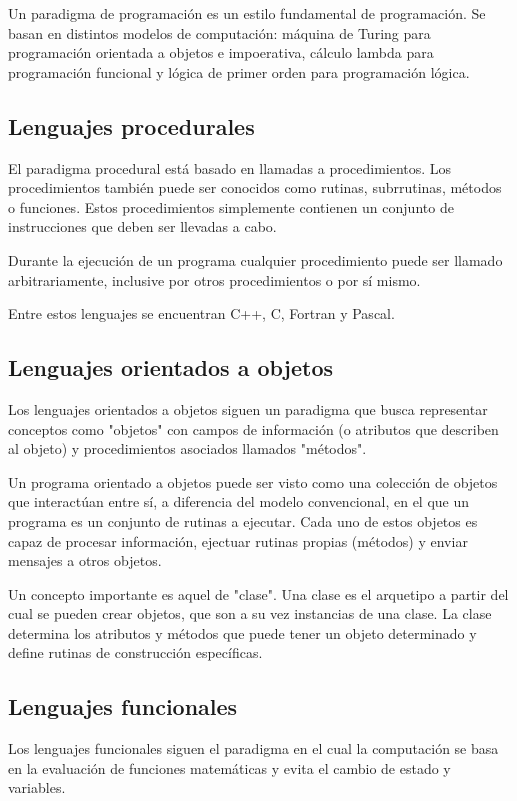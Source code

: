 \documentclass[a4paper,10pt]{article}
\begin{document}
Un paradigma de programación es un estilo fundamental de programación. Se basan en distintos modelos de computación: máquina de Turing para programación orientada a objetos e impoerativa, cálculo lambda para programación funcional y lógica de primer orden para programación lógica.

\subsection{Lenguajes procedurales}

El paradigma procedural está basado en llamadas a procedimientos. Los procedimientos también puede ser conocidos como rutinas, subrrutinas, métodos o funciones. Estos procedimientos simplemente contienen un conjunto de instrucciones que deben ser llevadas a cabo.

Durante la ejecución de un programa cualquier procedimiento puede ser llamado arbitrariamente, inclusive por otros procedimientos o por sí mismo.

Entre estos lenguajes se encuentran C++, C, Fortran y Pascal.


\subsection{Lenguajes orientados a objetos}

Los lenguajes orientados a objetos siguen un paradigma que busca representar conceptos como "objetos" con campos de información (o atributos que describen al objeto) y procedimientos asociados llamados "métodos".

Un programa orientado a objetos puede ser visto como una colección de objetos que interactúan entre sí, a diferencia del modelo convencional, en el que un programa es un conjunto de rutinas a ejecutar. Cada uno de estos objetos es capaz de procesar información, ejectuar rutinas propias (métodos) y enviar mensajes a otros objetos.

Un concepto importante es aquel de "clase". Una clase es el arquetipo a partir del cual se pueden crear objetos, que son a su vez instancias de una clase. La clase determina los atributos y métodos que puede tener un objeto determinado y define rutinas de construcción específicas.

\subsection{Lenguajes funcionales}

Los lenguajes funcionales siguen el paradigma en el cual la computación se basa en la evaluación de funciones matemáticas y evita el cambio de estado y variables.
\end{document}
